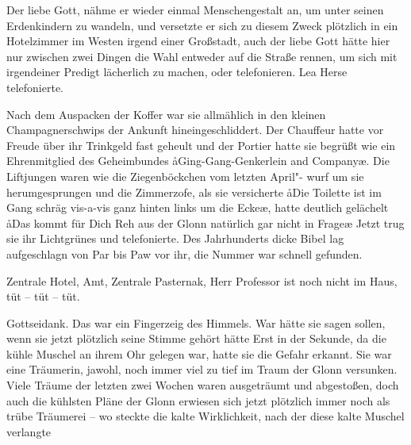

Der liebe Gott, nähme er wieder einmal Menschengestalt an,
um unter seinen Erdenkindern zu wandeln, und versetzte er
sich zu diesem Zweck plötzlich in ein Hotelzimmer im Westen
irgend einer Großstadt, auch der liebe Gott hätte hier nur
zwischen zwei Dingen die Wahl\dopp{} entweder auf die Straße
rennen, um sich mit irgendeiner Predigt lächerlich zu machen,
oder telefonieren. Lea Herse telefonierte.

Nach dem Auspacken der Koffer war sie allmählich in den
kleinen Champagnerschwips der Ankunft hineingeschliddert.
Der Chauffeur hatte vor Freude über ihr Trinkgeld fast geheult
und der Portier hatte sie begrüßt wie ein Ehrenmitglied des
Geheimbundes \aa{}Ging-Gang-Genkerlein and Company\ae{}. Die
Liftjungen waren wie die Ziegenböckchen vom letzten April"-%
wurf um sie herumgesprungen und die Zimmerzofe, als sie
versicherte\dopp{} \aa{}Die Toilette ist im Gang schräg vis-a-vis ganz
hinten links um die Ecke\ae{}, hatte deutlich gelächelt\dopp{} \aa{}Das
kommt für Dich Reh aus der Glonn natürlich gar nicht in
Frage\ausr{}\ae{} Jetzt trug sie ihr Lichtgrünes und telefonierte. Des
Jahrhunderts dicke Bibel lag aufgeschlagn von Par bis Paw
vor ihr, die Nummer war schnell gefunden.

Zentrale Hotel, Amt, Zentrale Pasternak, Herr Professor
ist noch nicht im Haus, tüt -- tüt -- tüt.

Gottseidank. Das war ein Fingerzeig des Himmels. War hätte
sie sagen sollen, wenn sie jetzt plötzlich seine Stimme gehört
hätte\frag{} Erst in der Sekunde, da die kühle Muschel an ihrem
Ohr gelegen war, hatte sie die Gefahr erkannt. Sie war eine
Träumerin, jawohl, noch immer viel zu tief im Traum der
Glonn versunken. Viele Träume der letzten zwei Wochen
waren ausgeträumt und abgestoßen, doch auch die kühlsten
Pläne der Glonn erwiesen sich jetzt plötzlich immer noch als
trübe Träumerei -- wo steckte die kalte Wirklichkeit, nach der
diese kalte Muschel verlangte\frag{}

